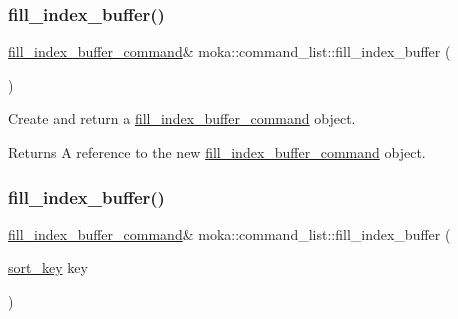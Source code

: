 \mbox{\label{classmoka_1_1command__list_aa845295c19241a778a47ff27ac38c912}} 
\subsubsection{\texorpdfstring{fill\_index\_buffer()}{fill\_index\_buffer()}\hspace{0.1cm}{\footnotesize\ttfamily [1/2]}}
{\footnotesize\ttfamily \mbox{\hyperlink{classmoka_1_1fill__index__buffer__command}{fill\+\_\+index\+\_\+buffer\+\_\+command}}\& moka\+::command\+\_\+list\+::fill\+\_\+index\+\_\+buffer (\begin{DoxyParamCaption}{ }\end{DoxyParamCaption})}



Create and return a \mbox{\hyperlink{classmoka_1_1fill__index__buffer__command}{fill\+\_\+index\+\_\+buffer\+\_\+command}} object. 

\begin{DoxyReturn}{Returns}
A reference to the new \mbox{\hyperlink{classmoka_1_1fill__index__buffer__command}{fill\+\_\+index\+\_\+buffer\+\_\+command}} object. 
\end{DoxyReturn}
\mbox{\label{classmoka_1_1command__list_a596b79fc1a99395c25d3aec80309cf6d}} 
\subsubsection{\texorpdfstring{fill\_index\_buffer()}{fill\_index\_buffer()}\hspace{0.1cm}{\footnotesize\ttfamily [2/2]}}
{\footnotesize\ttfamily \mbox{\hyperlink{classmoka_1_1fill__index__buffer__command}{fill\+\_\+index\+\_\+buffer\+\_\+command}}\& moka\+::command\+\_\+list\+::fill\+\_\+index\+\_\+buffer (\begin{DoxyParamCaption}\item[{\mbox{\hyperlink{namespacemoka_afa30a616e67b83113ebdb857555cf2bb}{sort\+\_\+key}}}]{key }\end{DoxyParamCaption})}



